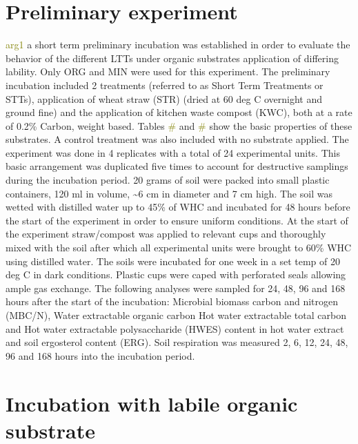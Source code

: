 \documentclass[12pt]{report}
\newcommand{\myGreen}[1]{\textcolor{olive}{#1}} %
\begin{document}
    
    
    
        
\section{Preliminary experiment}
	
	\myGreen{arg1}
	a short term preliminary incubation was established in order to evaluate the behavior of the different LTTs under organic substrates application of differing lability.  Only ORG and MIN were used for this experiment.  The preliminary incubation included 2 treatments (referred to as Short Term Treatments or STTs), application of wheat straw (STR) (dried at 60 deg C overnight and ground fine) and the application of kitchen waste compost (KWC), both at a rate of 0.2\% Carbon, weight based. Tables \myGreen{\#} and \myGreen{\#} show the basic properties of these substrates. A control treatment was also included with no substrate applied. The experiment was done in 4 replicates with a total of 24 experimental units. This basic arrangement was duplicated five times to account for destructive samplings during the incubation period. 20 grams of soil were packed into small plastic containers, 120 ml in volume, \~{}6 cm in diameter and 7 cm high. The soil was wetted with distilled water up to 45\% of WHC and incubated for 48 hours before the start of the experiment in order to ensure uniform conditions. At the start of the experiment straw/compost was applied to relevant cups and thoroughly mixed with the soil after which all experimental units were brought to 60\% WHC using distilled water. The soils were incubated for one week in a set temp of 20 deg C in dark conditions. Plastic cups were caped with perforated seals allowing ample gas exchange. The following analyses were sampled for 24, 48, 96 and 168 hours after the start of the incubation: Microbial biomass carbon and nitrogen (MBC/N), Water extractable organic carbon  Hot water extractable total carbon  and Hot water extractable polysaccharide (HWES) content in hot water extract and soil ergosterol content (ERG). Soil respiration was measured 2, 6, 12, 24, 48, 96 and 168 hours into the incubation period. 

		
	
\section{Incubation with labile organic substrate}
	
\end{document}
